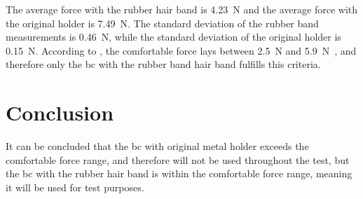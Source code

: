 The average force with the rubber hair band is \SI{4.23}{\newton} and the average force with the original holder is \SI{7.49}{\newton}. The standard deviation of the rubber band measurements is \SI{0.46}{\newton}, while the standard deviation of the original holder is \SI{0.15}{\newton}. According to \citep{ANSI_S35}, the comfortable force lays between \SI{2.5}{\newton} and \SI{5.9}{\newton,} and therefore only the \gls{bc} with the rubber band hair band fulfills this criteria. 

\section*{Conclusion}

It can be concluded that the \gls{bc} with original metal holder exceeds the comfortable force range, and therefore will not be used throughout the test, but the \gls{bc} with the rubber hair band is within the comfortable force range, meaning it will be used for test purposes.


